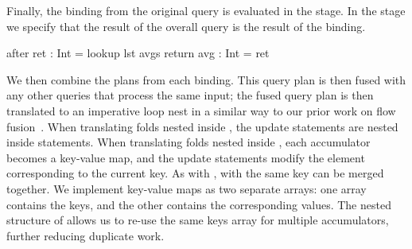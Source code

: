 
Finally, the \IcC@ret@ binding from the original query is evaluated in the \IcC@after@ stage. In the \IcC@return@ stage we specify that the result of the overall query \IcC@avg@ is the result of the \IcC@ret@ binding.
\begin{icicle-core}
  after  { ret : Int = lookup lst avgs }
  return { avg : Int = ret }
\end{icicle-core}


We then combine the plans from each binding.
This query plan is then fused with any other queries that process the same input; the fused query plan is then translated to an imperative loop nest in a similar way to our prior work on flow fusion~\cite{lippmeier2013data}.
When translating folds nested inside \IcC@filter@s, the update statements are nested inside \IcC@if@ statements.
When translating folds nested inside \IcC@group@s, each accumulator becomes a key-value map, and the update statements modify the element corresponding to the current key.
As with \IcC@filter@s, \IcC@group@s with the same key can be merged together.
We implement key-value maps as two separate arrays: one array contains the keys, and the other contains the corresponding values.
The nested structure of \IcC@group@s allows us to re-use the same keys array for multiple accumulators, further reducing duplicate work.

